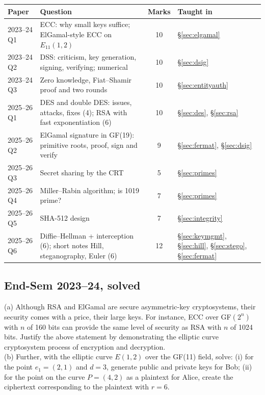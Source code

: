 \begin{center}\small
\begin{tabularx}{\textwidth}{@{}l X c l@{}}
\toprule
Paper & Question & Marks & Taught in\\
\midrule
2023--24 Q1 & ECC: why small keys suffice; ElGamal-style ECC on $E_{11}(1, 2)$ & 10 & \S\ref{sec:elgamal}\\
2023--24 Q2 & DSS: criticism, key generation, signing, verifying; numerical & 10 & \S\ref{sec:dsig}\\
2023--24 Q3 & Zero knowledge, Fiat--Shamir proof and two rounds & 10 & \S\ref{sec:entityauth}\\
2025--26 Q1 & DES and double DES: issues, attacks, fixes (4); RSA with fast exponentiation (6) & 10 & \S\ref{sec:des}, \S\ref{sec:rsa}\\
2025--26 Q2 & ElGamal signature in GF(19): primitive roots, proof, sign and verify & 9 & \S\ref{sec:fermat}, \S\ref{sec:dsig}\\
2025--26 Q3 & Secret sharing by the CRT & 5 & \S\ref{sec:primes}\\
2025--26 Q4 & Miller--Rabin algorithm; is 1019 prime? & 7 & \S\ref{sec:primes}\\
2025--26 Q5 & SHA-512 design & 7 & \S\ref{sec:integrity}\\
2025--26 Q6 & Diffie--Hellman + interception (6); short notes Hill, steganography, Euler (6) & 12 & \S\ref{sec:keymgmt}, \S\ref{sec:hill}, \S\ref{sec:stego}, \S\ref{sec:fermat}\\
\bottomrule
\end{tabularx}
\end{center}

\subsection{End-Sem 2023--24, solved}

\begin{keybox}[title={Q1 (10 marks)}]
(a) Although RSA and ElGamal are secure asymmetric-key cryptosystems, their security comes with a price, their large keys. For instance, ECC over GF$(2^n)$ with $n$ of 160 bits can provide the same level of security as RSA with $n$ of 1024 bits. Justify the above statement by demonstrating the elliptic curve cryptosystem process of encryption and decryption.\\
(b) Further, with the elliptic curve $E(1, 2)$ over the GF(11) field, solve: (i) for the point $e_1 = (2, 1)$ and $d = 3$, generate public and private keys for Bob; (ii) for the point on the curve $P = (4, 2)$ as a plaintext for Alice, create the ciphertext corresponding to the plaintext with $r = 6$.
\end{keybox}

